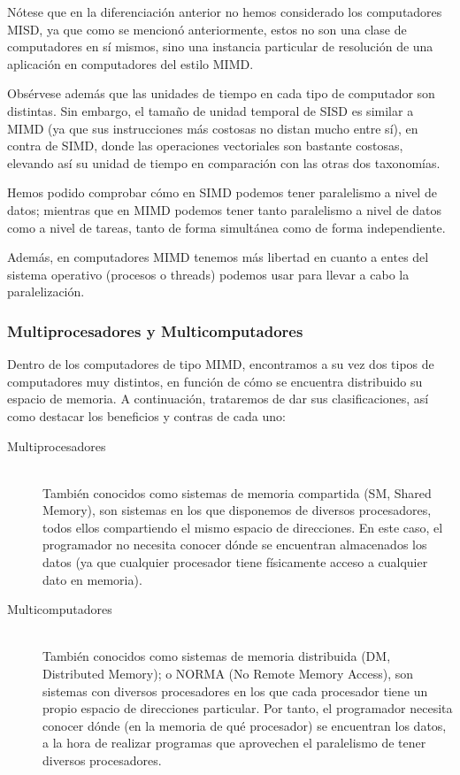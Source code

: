 \begin{observacion}
    Nótese que en la diferenciación anterior no hemos considerado los computadores MISD, ya que como se mencionó anteriormente, estos no son una clase de computadores en sí mismos, sino una instancia particular de resolución de una aplicación en computadores del estilo MIMD.

    Obsérvese además que las unidades de tiempo en cada tipo de computador son distintas. Sin embargo, el tamaño de unidad temporal de SISD es similar a MIMD (ya que sus instrucciones más costosas no distan mucho entre sí), en contra de SIMD, donde las operaciones vectoriales son bastante costosas, elevando así su unidad de tiempo en comparación con las otras dos taxonomías.

    Hemos podido comprobar cómo en SIMD podemos tener paralelismo a nivel de datos; mientras que en MIMD podemos tener tanto paralelismo a nivel de datos como a nivel de tareas, tanto de forma simultánea como de forma independiente.

    Además, en computadores MIMD tenemos más libertad en cuanto a entes del sistema operativo (procesos o threads) podemos usar para llevar a cabo la paralelización.
\end{observacion}

\subsubsection{Multiprocesadores y Multicomputadores}
Dentro de los computadores de tipo MIMD, encontramos a su vez dos tipos de computadores muy distintos, en función de cómo se encuentra distribuido su espacio de memoria. A continuación, trataremos de dar sus clasificaciones, así como destacar los beneficios y contras de cada uno:
\begin{description}
    \item [Multiprocesadores]~\\
        También conocidos como sistemas de memoria compartida (SM, Shared Memory), son sistemas en los que disponemos de diversos procesadores, todos ellos compartiendo el mismo espacio de direcciones. En este caso, el programador no necesita conocer dónde se encuentran almacenados los datos (ya que cualquier procesador tiene físicamente acceso a cualquier dato en memoria).
    \item [Multicomputadores]~\\
        También conocidos como sistemas de memoria distribuida (DM, Distributed Memory); o NORMA (No Remote Memory Access), son sistemas con diversos procesadores en los que cada procesador tiene un propio espacio de direcciones particular. Por tanto, el programador necesita conocer dónde (en la memoria de qué procesador) se encuentran los datos, a la hora de realizar programas que aprovechen el paralelismo de tener diversos procesadores.
\end{description}

